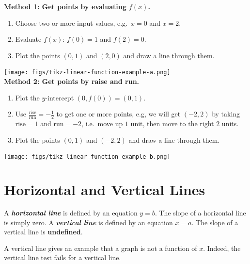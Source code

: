 \documentclass[
  en,11pt]{elegantbook}
\providecommand{\tightlist}{%
  \setlength{\itemsep}{0pt}\setlength{\parskip}{0pt}}
\begin{document}
\begin{solution}

\textbf{Method 1: Get points by evaluating \(f(x)\).}

\begin{enumerate}
\def\labelenumi{\arabic{enumi}.}
\tightlist
\item
  Choose two or more input values, e.g.~\(x=0\) and \(x=2\).
\item
  Evaluate \(f(x)\): \(f(0)=1\) and \(f(2)=0\).
\item
  Plot the points \((0, 1)\) and \((2, 0)\) and draw a line through them.
\end{enumerate}

\texttt{[image: figs/tikz-linear-function-example-a.png]}\\

\textbf{Method 2: Get points by raise and run.}

\begin{enumerate}
\def\labelenumi{\arabic{enumi}.}
\tightlist
\item
  Plot the \(y\)-intercept \((0, f(0))=(0, 1)\).
\item
  Use \(\frac{\text{rise}}{\text{run}}=-\frac{1}{2}\) to get one or more points, e.g, we will get \((-2, 2)\) by taking \(\text{rise}=1\) and \(\text{run}=-2\), i.e.~move up \(1\) unit, then move to the right \(2\) units.
\item
  Plot the points \((0, 1)\) and \((-2, 2)\) and draw a line through them.
\end{enumerate}

\texttt{[image: figs/tikz-linear-function-example-b.png]}\\

\end{solution}

\hypertarget{horizontal-and-vertical-lines}{%
\section{Horizontal and Vertical Lines}\label{horizontal-and-vertical-lines}}

A \textbf{\emph{horizontal line}} is defined by an equation \(y=b\). The slope of a horizontal line is simply zero.
A \textbf{\emph{vertical line}} is defined by an equation \(x=a\). The slope of a vertical line is \textbf{undefined}.

A vertical line gives an example that a graph is not a function of \(x\). Indeed,
the vertical line test fails for a vertical line.
\end{document}
